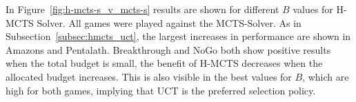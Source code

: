 \documentclass{icga}
\begin{document}


In Figure~\ref{fig:h-mcts-s_v_mcts-s} results are shown for different $B$ values for H-MCTS Solver. All games were played against the MCTS-Solver. As in Subsection~\ref{subsec:hmcts_uct}, the largest increases in performance are shown in Amazons and Pentalath. Breakthrough and NoGo both show positive results when the total budget is small, the benefit of H-MCTS decreases when the allocated budget increases. This is also visible in the best values for $B$, which are high for both games, implying that UCT is the preferred selection policy.

\begin{table}[ht]
\centering
\tabcolsep=0.3cm
\end{table}
\end{document}
